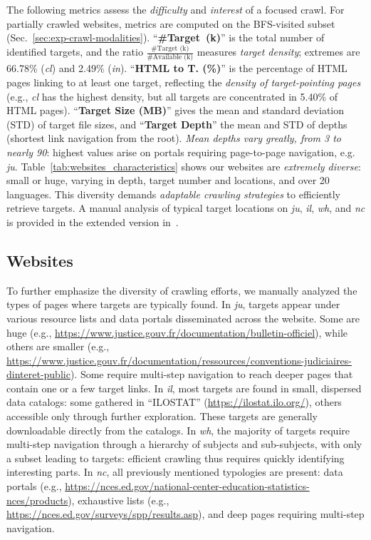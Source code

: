The following metrics assess the \emph{difficulty} and \emph{interest} of a focused crawl. For partially crawled websites, metrics are computed on the BFS-visited subset (Sec.~\ref{sec:exp-crawl-modalities}). ``\textbf{\#Target~(k)}'' is the total number of identified targets, and the ratio $\frac{\textrm{\#Target (k)}}{\textrm{\#Available (k)}}$ measures \emph{target density}; extremes are 66.78\% (\emph{cl}) and 2.49\% (\emph{in}). ``\textbf{HTML to T. (\%)}'' is the percentage of HTML pages linking to at least one target, reflecting the \emph{density of target-pointing pages} (e.g., \emph{cl} has the highest density, but all targets are concentrated in 5.40\% of HTML pages). ``\textbf{Target Size (MB)}'' gives the mean and standard deviation (STD) of target file sizes, and ``\textbf{Target Depth}'' the mean and STD of depths (shortest link navigation from the root). \emph{Mean depths vary greatly, from 3 to nearly 90}: highest values arise on portals requiring page-to-page navigation, e.g. \emph{ju}.
Table~\ref{tab:websites_characteristics} shows our websites are \emph{extremely diverse}: small or huge, varying in depth, target number and  locations, and over 20 languages. This diversity demands \emph{adaptable crawling strategies} to efficiently retrieve targets. A manual analysis of typical target locations on \emph{ju}, \emph{il}, \emph{wh}, and \emph{nc} is provided in the extended version in~\cite{github_repository}.


\begin{toappendix}

\subsection{Websites}

To further emphasize the diversity of crawling efforts, we manually analyzed the types of pages where targets are typically found. In \emph{ju}, targets appear under various resource lists and data portals disseminated across the website. Some are huge (e.g., \url{https://www.justice.gouv.fr/documentation/bulletin-officiel}), while others are smaller (e.g., \url{https://www.justice.gouv.fr/documentation/ressources/conventions-judiciaires-dinteret-public}). Some require multi-step navigation to reach deeper pages that contain one or a few target links. In \emph{il}, most targets are found in small, dispersed data catalogs: some gathered in ``ILOSTAT'' (\url{https://ilostat.ilo.org/}), others accessible only through further exploration. These targets are generally downloadable directly from the catalogs. In \emph{wh}, the majority of targets require multi-step navigation through a hierarchy of subjects and sub-subjects, with only a subset leading to targets: efficient crawling thus requires quickly identifying interesting parts. In \emph{nc}, all previously mentioned typologies are present: data portals (e.g., \url{https://nces.ed.gov/national-center-education-statistics-nces/products}), exhaustive lists (e.g., \url{https://nces.ed.gov/surveys/spp/results.asp}), and deep pages requiring multi-step navigation.
\end{toappendix}
